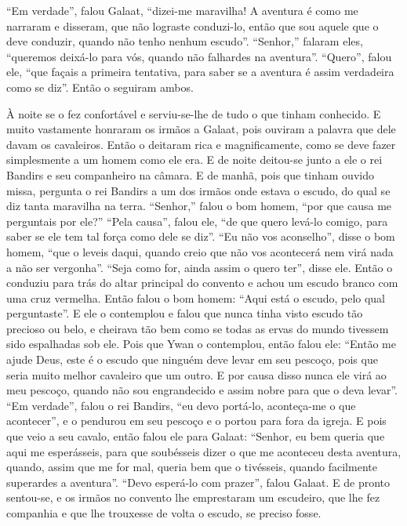 “Em verdade”, falou Galaat, “dizei-me maravilha! A aventura é como me narraram e
disseram, que não lograste conduzi-lo, então que sou aquele que o deve
conduzir, quando não tenho nenhum escudo”.  “Senhor,” falaram eles, “queremos
deixá-lo para vós, quando não falhardes na aventura”. “Quero”, falou ele, “que
façais a primeira tentativa, para saber se a aventura é assim verdadeira como
se diz”. Então o seguiram ambos. 

À noite se o fez confortável e serviu-se-lhe de tudo o que tinham conhecido.  E
muito vastamente honraram os irmãos a Galaat, pois ouviram a palavra que dele
davam os cavaleiros. Então o deitaram rica e magnificamente, como se deve fazer
simplesmente a um homem como ele era. E de noite deitou-se junto a ele
o rei Bandirs e seu companheiro na câmara. E de manhã, pois que tinham ouvido
missa, pergunta o rei Bandirs a um dos irmãos onde estava o escudo, do qual se
diz tanta maravilha na terra. “Senhor,” falou o bom homem, “por que causa me
perguntais por ele?” “Pela causa”, falou ele, “de que quero levá-lo comigo,
para saber se ele tem tal força como dele se diz”. “Eu não vos aconselho”,
disse o bom homem, “que o leveis daqui, quando creio que não vos acontecerá nem
virá nada a não ser vergonha”. “Seja como for, ainda assim o quero ter”, disse
ele. Então o conduziu para trás do altar principal do convento e achou
um escudo branco com uma cruz vermelha. Então falou o bom homem: “Aqui está o
escudo, pelo qual perguntaste”. E ele o contemplou e falou que nunca tinha
visto escudo tão precioso ou belo, e cheirava tão bem como se todas as ervas do
mundo tivessem sido espalhadas sob ele. Pois que Ywan o contemplou, então falou
ele: “Então me ajude Deus, este é o escudo que ninguém deve levar em seu
pescoço, pois que seria muito melhor cavaleiro que um outro. E por causa disso
nunca ele virá ao meu pescoço, quando não sou engrandecido e assim nobre para
que o deva levar”. “Em verdade”, falou o rei Bandirs, “eu devo
portá-lo, aconteça-me o que acontecer”, e o pendurou em seu pescoço e o portou
para fora da igreja. E pois que veio a seu cavalo, então falou ele para Galaat:
“Senhor, eu bem queria que aqui me esperásseis, para que soubésseis dizer o que
me aconteceu desta aventura, quando, assim que me for mal, queria bem que o
tivésseis, quando facilmente superardes a aventura”. “Devo esperá-lo
com prazer”, falou Galaat. E de pronto sentou-se, e os irmãos no convento lhe
emprestaram um escudeiro, que lhe fez companhia e que lhe trouxesse de volta o
escudo, se preciso fosse. 

